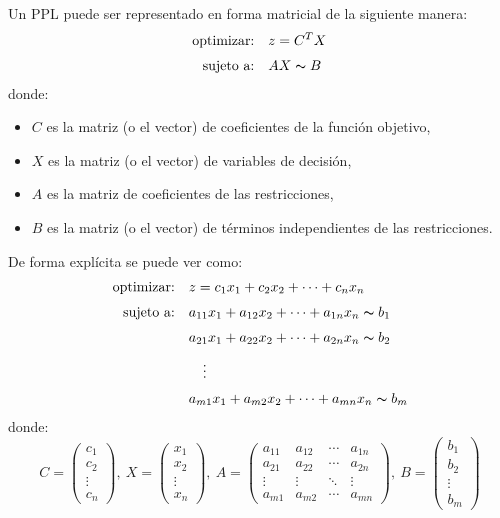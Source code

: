 Un PPL puede ser representado en forma matricial de la siguiente manera:
\begin{align*}
  \text{optimizar:} \quad   &z = C^TX \\[3pt]
  \text{sujeto a:} \quad    &AX \thicksim  B \\
\end{align*}
donde:
\begin{itemize}
  \item \(C\) es la matriz (o el vector) de coeficientes de la función objetivo,
  \item \(X\) es la matriz (o el vector) de variables de decisión,
  \item \(A\) es la matriz de coeficientes de las restricciones,
  \item \(B\) es la matriz (o el vector) de términos independientes de las restricciones.
\end{itemize}
\vspace{5pt}
\noindent De forma explícita se puede ver como:
\begin{align*}
  \text{optimizar:} \quad   &z = c_{1}x_{1} + c_{2}x_{2} + \cdots + c_{n}x_{n} \\[3pt]
  \text{sujeto a:} \quad    &a_{11}x_{1} + a_{12}x_{2} + \cdots + a_{1n}x_{n} \thicksim b_{1} \\[3pt]
                            &a_{21}x_{1} + a_{22}x_{2} + \cdots + a_{2n}x_{n} \thicksim b_{2} \\[3pt]
                            &\quad \vdots \\[3pt]
                            &a_{m1}x_{1} + a_{m2}x_{2} + \cdots + a_{mn}x_{n} \thicksim b_{m}
\end{align*}
donde:
\[
  C = \begin{pmatrix} c_1 \\ c_2 \\ \vdots \\ c_n \end{pmatrix},\ X = \begin{pmatrix} x_1 \\ x_2 \\ \vdots \\ x_n \end{pmatrix},\ A = \begin{pmatrix} a_{11} & a_{12} & \cdots & a_{1n} \\ a_{21} & a_{22} & \cdots & a_{2n} \\ \vdots & \vdots & \ddots & \vdots \\ a_{m1} & a_{m2} & \cdots & a_{mn} \end{pmatrix},\ B = \begin{pmatrix} b_1 \\ b_2 \\ \vdots \\ b_m \end{pmatrix}
\]

